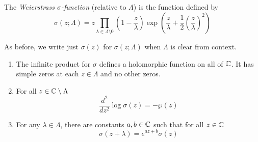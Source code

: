 \begin{definition}
	The \emph{Weierstrass $\sigma$-function} (relative to $\Lambda$) is the
	function defined by
	\begin{equation*}
		\sigma(z; \Lambda) = z \prod_{\lambda\in\Lambda\setminus 0}
		\left(1 - \frac{z}{\lambda}\right)
		\exp\left(\frac{z}{\lambda} + \frac{1}{2}\left(\frac{z}{\lambda}\right)^2\right)
	\end{equation*}
\end{definition}

\begin{notation}
	As before, we write just $\sigma(z)$ for $\sigma(z; \Lambda)$ when $\Lambda$
	is clear from context.
\end{notation}


\begin{lemma}
	\label{lem:sigma-properties}
	\begin{enumerate}[label=(\alph*)]
		\item The infinite product for $\sigma$ defines a holomorphic function
			on all of $\mathbb{C}$. It has simple zeros at each $z \in \Lambda$
			and no other zeros.
		\item For all $z \in \mathbb{C}\setminus \Lambda$
			\begin{equation*}
				\frac{d^2}{dz^2}\log\sigma(z) = -\wp(z)
			\end{equation*}
		\item For any $\lambda \in \Lambda$, there are constants
			$a, b \in \mathbb{C}$ such that for all $z\in \mathbb{C}$
			\begin{equation*}
				\sigma(z + \lambda) = e^{az + b}\sigma(z)
			\end{equation*}
	\end{enumerate}
\end{lemma}

